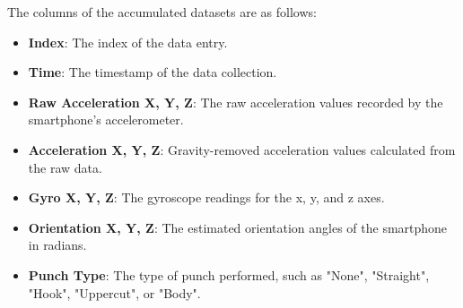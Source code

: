 \documentclass{article}
\begin{document}
The columns of the accumulated datasets are as follows:
\begin{itemize}
    \item \textbf{Index}: The index of the data entry.
    \item \textbf{Time}: The timestamp of the data collection.
    \item \textbf{Raw Acceleration X, Y, Z}: The raw acceleration values recorded by the smartphone's accelerometer.
    \item \textbf{Acceleration X, Y, Z}: Gravity-removed acceleration values calculated from the raw data.
    \item \textbf{Gyro X, Y, Z}: The gyroscope readings for the x, y, and z axes.
    \item \textbf{Orientation X, Y, Z}: The estimated orientation angles of the smartphone in radians.
    \item \textbf{Punch Type}: The type of punch performed, such as "None", "Straight", "Hook", "Uppercut", or "Body".
\end{itemize}
\end{document}
